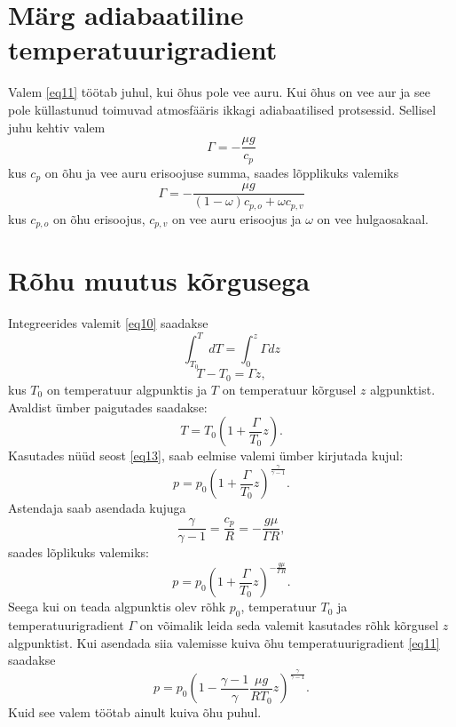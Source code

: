 \documentclass{trkut}%
\begin{document}
\section{Märg adiabaatiline temperatuurigradient}
Valem \ref{eq11} töötab juhul, kui õhus pole vee auru. Kui õhus on vee aur ja see pole küllastunud toimuvad atmosfääris ikkagi adiabaatilised protsessid. Sellisel juhu kehtiv valem 
\begin{equation*}
\Gamma = -\frac{\mu g}{c_p}
\end{equation*}
kus $c_p$ on õhu ja vee auru erisoojuse summa, saades lõpplikuks valemiks
\begin{equation*}
\Gamma = -\frac{\mu g}{(1-\omega)c_{p,o} + \omega c_{p,v}}
\end{equation*}
kus $c_{p,o}$ on õhu erisoojus, $c_{p,v}$ on vee auru erisoojus ja $\omega$ on vee hulgaosakaal.

\section{Rõhu muutus kõrgusega }
Integreerides valemit \ref{eq10} saadakse
\begin{equation*}
\int_{T_0}^{T} dT = \int_{0}^{z} \Gamma dz
\end{equation*}
\begin{equation*}
T-T_0 = \Gamma z,
\end{equation*}
kus $T_0$ on temperatuur algpunktis ja $T$ on temperatuur kõrgusel $z$ algpunktist. Avaldist ümber paigutades saadakse:
\begin{equation*}
T = T_0 \left(1+\frac{\Gamma}{T_0}z\right).
\end{equation*}
Kasutades nüüd seost \ref{eq13}, saab eelmise valemi ümber kirjutada kujul:
\begin{equation*}
p=p_0 \left(1+\frac{\Gamma}{T_0}z\right)^{\frac{\gamma}{\gamma-1}}.
\end{equation*}
Astendaja saab asendada kujuga
\begin{equation*}
\frac{\gamma}{\gamma-1} = \frac{c_p}{R} = -\frac{g\mu}{\Gamma R},
\end{equation*}
saades lõplikuks valemiks:
\begin{equation*}
p=p_0 \left(1+\frac{\Gamma}{T_0}z\right)^{ -\frac{g\mu}{\Gamma R}}.
\end{equation*}
Seega kui on teada algpunktis olev rõhk $p_0$, temperatuur $T_0$ ja temperatuurigradient $\Gamma$ on võimalik leida seda valemit kasutades rõhk kõrgusel $z$ algpunktist. Kui asendada siia valemisse kuiva õhu temperatuurigradient \ref{eq11} saadakse
\begin{equation*}
p=p_0 \left(1-\frac{\gamma-1}{\gamma}\frac{\mu g}{RT_0}z\right)^{\frac{\gamma}{\gamma-1}}.
\end{equation*}
Kuid see valem töötab ainult kuiva õhu puhul.
\end{document}
